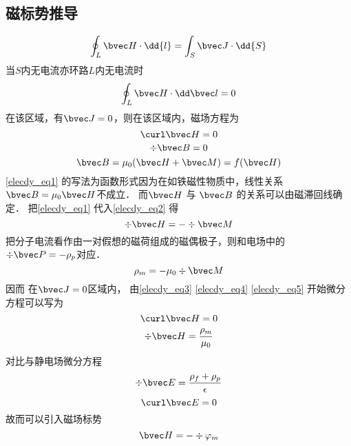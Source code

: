 
\subsection{磁标势推导}
\begin{equation}
\oint_L \bvec H \cdot \dd{l} = \int_S \bvec J \cdot \dd{S}
\end{equation}
当$S$内无电流亦环路$L$内无电流时
\begin{equation}
\oint_ L\bvec H \cdot \dd \bvec l = 0
\end{equation}
在该区域，有$\bvec J=0$，则在该区域内，磁场方程为 
\begin{equation}\label{elecdy_eq3}
\curl \bvec H =0
\end{equation}
\begin{equation}\label{elecdy_eq2}
\div \bvec B=0
\end{equation}
\begin{equation}\label{elecdy_eq1}
\bvec B=\mu_0(\bvec H+\bvec M)=f(\bvec H)
\end{equation}
\autoref{elecdy_eq1} 的写法为函数形式因为在如铁磁性物质中，线性关系$\bvec B=\mu_0 \bvec H$不成立．
而$\bvec H$ 与 $\bvec B$ 的关系可以由磁滞回线确定．
把\autoref{elecdy_eq1} 代入\autoref{elecdy_eq2} 得
\begin{equation}\label{elecdy_eq4}
\div \bvec H= - \div \bvec M
\end{equation}
把分子电流看作由一对假想的磁荷组成的磁偶极子，则和电场中的$\div \bvec P=-\rho _p$对应．
\begin{equation}\label{elecdy_eq5}
\rho_m=-\mu_0 \div \bvec M
\end{equation}
因而 在$\bvec J=0$区域内， 由\autoref{elecdy_eq3} \autoref{elecdy_eq4} \autoref{elecdy_eq5} 开始微分方程可以写为
\begin{equation}
\curl \bvec H=0 
\end{equation}
\begin{equation}
\div \bvec H= \dfrac{\rho_m}{\mu_0}
\end{equation}
对比与静电场微分方程
\begin{equation}
\div \bvec E=\dfrac{\rho_f+\rho_p}{\epsilon}
\end{equation}
\begin{equation}
\curl \bvec E=0
\end{equation}
故而可以引入磁场标势
\begin{equation}
\bvec H=-\div \varphi_m
\end{equation}
